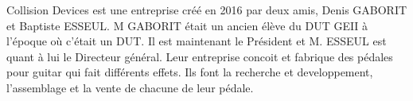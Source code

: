 \documentclass[french]{article}
\begin{document}
Collision Devices est une entreprise créé en 2016 par deux amis, Denis GABORIT et Baptiste ESSEUL. M GABORIT était un ancien élève du DUT GEII à l'époque où c'était un DUT. Il est maintenant le Président et M. ESSEUL est quant à lui le Directeur général. Leur entreprise concoit et fabrique des pédales pour guitar qui fait différents effets. Ils font la recherche et developpement, l'assemblage et la vente de chacune de leur pédale.
\end{document}
